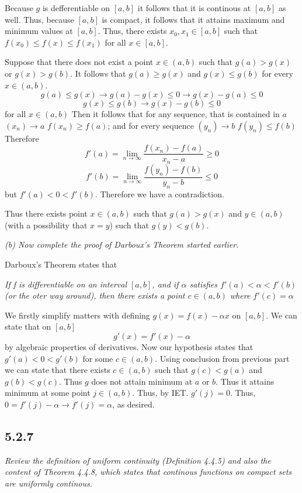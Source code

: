 \documentclass[11pt,oneside,titlepage]{book}
\begin{document}
Because $g$ is defferentiable on $[a, b]$ it follows that it is continous
at $[a, b]$ as well. Thus, because $[a, b]$ is compact, it follows that
it attains maximum and minimum values at $[a, b]$. Thus, there exists
$x_0, x_1 \in [a, b]$ such that $f(x_0) \leq f(x) \leq f(x_1)$ for
all $x \in [a, b]$.

Suppose that there does not exist a point $x \in (a, b)$ such that
$g(a) > g(x)$ or $g(x) > g(b)$.
It follows that
$g(a) \geq g(x)$ and $g(x) \leq g(b)$ for every $x \in (a, b)$.
$$g(a) \leq g(x) \to g(a) - g(x) \leq 0 \to g(x) - g(a) \leq 0 $$
$$g(x) \leq g(b) \to g(x) - g(b) \leq 0 $$
for all $x \in (a, b)$ Then it
follows that for any sequence, that is contained in $a$
$(x_n) \to a$ $f(x_n) \geq f(a)$; and for every sequence $(y_n) \to b$
$f(y_n) \leq f(b)$
Therefore
$$f'(a) = \lim_{n \to \infty} \frac{f(x_n) - f(a)}{x_n - a} \geq 0$$
$$f'(b) = \lim_{n \to \infty} \frac{f(y_n) - f(b)}{y_n - b} \leq 0$$
but $f'(a) < 0 < f'(b)$. Therefore we have a contradiction.

Thus there exists point $x \in (a, b)$ such that $g(a) > g(x)$ and
$y \in (a, b)$ (with a possibility that $x = y$) such that $g(y) < g(b)$.

\textit{(b) Now complete the proof of Darboux's Theorem started earlier.}

Darboux's Theorem states that

\textit{If f is differentiable on an interval $[a, b]$, and if $\alpha$
  satisfies $f'(a) < \alpha < f'(b)$ (or the oter way around), then there
  exists a point $c \in (a, b)$ where $f'(c) = \alpha$}

We firstly simplify  matters with defining $g(x) = f(x) - \alpha x$ on
$[a, b]$. We can state that on $[a, b]$
$$g'(x)  = f'(x) - \alpha$$
by algebraic properties of derivatives. Now our hypothesis states that
$g'(a) < 0 < g'(b)$ for some $c \in (a, b)$. Using conclusion from
previous part we can state that there exists $c \in (a, b)$ such that
$g(c) < g(a)$ and $g(b) < g(c)$. Thus $g$ does not attain minimum at
$a$ or $b$. Thus it attains minimum at some point $j \in (a, b)$. Thus, by
IET. $g'(j) = 0$. Thus, $0  = f'(j) - \alpha \to f'(j) = \alpha$, as desired.

\subsection*{5.2.7}
\textit{Review the definition of uniform continuity (Definition 4.4.5)
  and also the content of
  Theorem 4.4.8, which states that continous functions on compact sets are
  uniformly continous.}
\end{document}
